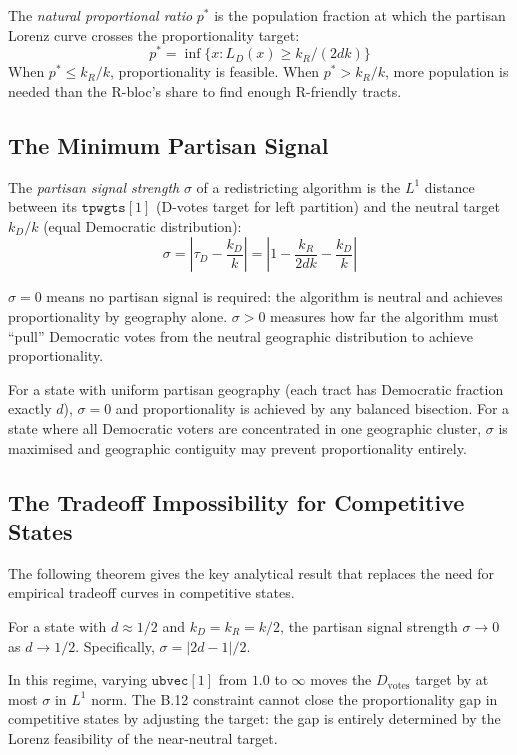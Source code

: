 \begin{definition}
The \emph{natural proportional ratio} $p^*$ is the population fraction at which
the partisan Lorenz curve crosses the proportionality target:
\[
  p^* = \inf\{x : L_D(x) \geq k_R/(2dk)\}
\]
When $p^* \leq k_R/k$, proportionality is feasible. When $p^* > k_R/k$,
more population is needed than the R-bloc's share to find enough R-friendly tracts.
\end{definition}

\subsection{The Minimum Partisan Signal}

\begin{definition}
The \emph{partisan signal strength} $\sigma$ of a redistricting algorithm is the
$L^1$ distance between its $\mathtt{tpwgts}[1]$ (D-votes target for left partition)
and the neutral target $k_D/k$ (equal Democratic distribution):
\[
  \sigma = \left|\tau_D - \frac{k_D}{k}\right| = \left|1 - \frac{k_R}{2dk} - \frac{k_D}{k}\right|
\]
\end{definition}

$\sigma = 0$ means no partisan signal is required: the algorithm is neutral
and achieves proportionality by geography alone.
$\sigma > 0$ measures how far the algorithm must ``pull'' Democratic votes
from the neutral geographic distribution to achieve proportionality.

\begin{proposition}
For a state with uniform partisan geography (each tract has Democratic fraction
exactly $d$), $\sigma = 0$ and proportionality is achieved by any balanced bisection.
For a state where all Democratic voters are concentrated in one geographic cluster,
$\sigma$ is maximised and geographic contiguity may prevent proportionality entirely.
\end{proposition}

\subsection{The Tradeoff Impossibility for Competitive States}

The following theorem gives the key analytical result that replaces the need
for empirical tradeoff curves in competitive states.

\begin{theorem}
\label{thm:invariance}
For a state with $d \approx 1/2$ and $k_D = k_R = k/2$, the partisan signal
strength $\sigma \to 0$ as $d \to 1/2$.
Specifically, $\sigma = |2d - 1| / 2$.

In this regime, varying $\mathtt{ubvec}[1]$ from $1.0$ to $\infty$ moves the
$D_{\text{votes}}$ target by at most $\sigma$ in $L^1$ norm.
The B.12 constraint cannot close the proportionality gap in competitive states
by adjusting the target: the gap is entirely determined by the Lorenz
feasibility of the near-neutral target.
\end{theorem}

